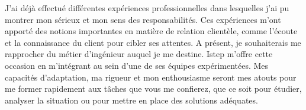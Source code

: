 \documentclass[11pt, a4paper]{awesome-cv}
\begin{document}
\begin{cvletter}
\vspace{2mm} 

J'ai déjà effectué différentes expériences professionnelles dans lesquelles j'ai pu montrer mon sérieux et mon sens des responsabilités. Ces expériences m'ont apporté des notions importantes en matière de relation clientèle, comme l'écoute et la connaissance du client pour cibler ses attentes. A présent, je souhaiterais me rapprocher du métier d'ingénieur auquel je me destine. Istep m'offre cette occasion en m'intégrant au sein d'une de ses équipes expérimentées. Mes capacités d'adaptation, ma rigueur et mon enthousiasme seront mes atouts pour me former rapidement aux tâches que vous me confierez, que ce soit pour étudier, analyser la situation ou pour mettre en place des solutions adéquates.




\end{cvletter}


\makeletterclosing
\end{document}
